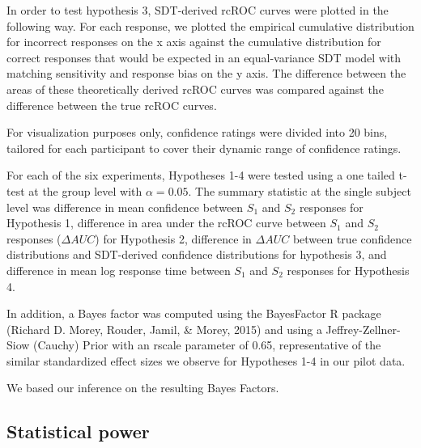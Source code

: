 \documentclass[12pt,twoside]{reedthesis}
\begin{document}
In order to test hypothesis 3, SDT-derived rcROC curves were plotted in the following way. For each response, we plotted the empirical cumulative distribution for incorrect responses on the x axis against the cumulative distribution for correct responses that would be expected in an equal-variance SDT model with matching sensitivity and response bias on the y axis. The difference between the areas of these theoretically derived rcROC curves was compared against the difference between the true rcROC curves.

For visualization purposes only, confidence ratings were divided into 20 bins, tailored for each participant to cover their dynamic range of confidence ratings.

For each of the six experiments, Hypotheses 1-4 were tested using a one tailed t-test at the group level with \(\alpha=0.05\). The summary statistic at the single subject level was difference in mean confidence between \(S_1\) and \(S_2\) responses for Hypothesis 1, difference in area under the rcROC curve between \(S_1\) and \(S_2\) responses (\(\Delta AUC\)) for Hypothesis 2, difference in \(\Delta AUC\) between true confidence distributions and SDT-derived confidence distributions for hypothesis 3, and difference in mean log response time between \(S_1\) and \(S_2\) responses for Hypothesis 4.

In addition, a Bayes factor was computed using the BayesFactor R package (Richard D. Morey, Rouder, Jamil, \& Morey, 2015) and using a Jeffrey-Zellner-Siow (Cauchy) Prior with an rscale parameter of 0.65, representative of the similar standardized effect sizes we observe for Hypotheses 1-4 in our pilot data.

We based our inference on the resulting Bayes Factors.

\hypertarget{statistical-power}{%
\subsection{Statistical power}\label{statistical-power}}
\end{document}
